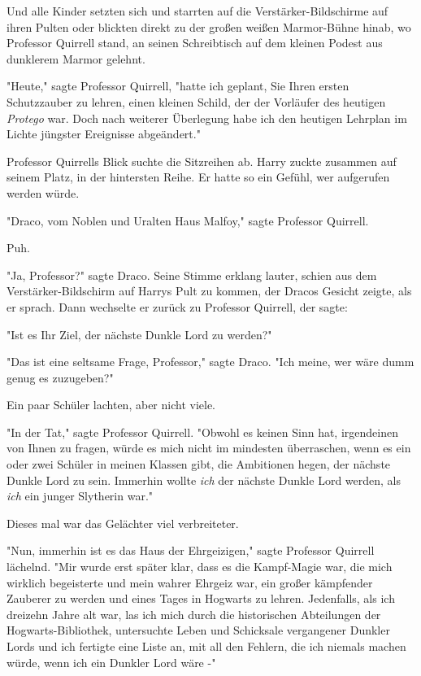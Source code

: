 {Und alle Kinder setzten sich und starrten auf die Verstärker-Bildschirme auf ihren Pulten oder blickten direkt zu der großen weißen Marmor-Bühne hinab, wo Professor Quirrell stand, an seinen Schreibtisch auf dem kleinen Podest aus dunklerem Marmor gelehnt.

"Heute," sagte Professor Quirrell, "hatte ich geplant, Sie Ihren ersten Schutzzauber zu lehren, einen kleinen Schild, der der Vorläufer des heutigen \emph{Protego} war. Doch nach weiterer Überlegung habe ich den heutigen Lehrplan im Lichte jüngster Ereignisse abgeändert."

Professor Quirrells Blick suchte die Sitzreihen ab. Harry zuckte zusammen auf seinem Platz, in der hintersten Reihe. Er hatte so ein Gefühl, wer aufgerufen werden würde.

"Draco, vom Noblen und Uralten Haus Malfoy," sagte Professor Quirrell.

Puh.

"Ja, Professor?" sagte Draco. Seine Stimme erklang lauter, schien aus dem Verstärker-Bildschirm auf Harrys Pult zu kommen, der Dracos Gesicht zeigte, als er sprach. Dann wechselte er zurück zu Professor Quirrell, der sagte:

"Ist es Ihr Ziel, der nächste Dunkle Lord zu werden?"

"Das ist eine seltsame Frage, Professor," sagte Draco. "Ich meine, wer wäre dumm genug es zuzugeben?"

Ein paar Schüler lachten, aber nicht viele.

"In der Tat," sagte Professor Quirrell. "Obwohl es keinen Sinn hat, irgendeinen von Ihnen zu fragen, würde es mich nicht im mindesten überraschen, wenn es ein oder zwei Schüler in meinen Klassen gibt, die Ambitionen hegen, der nächste Dunkle Lord zu sein. Immerhin wollte \emph{ich} der nächste Dunkle Lord werden, als \emph{ich} ein junger Slytherin war."

Dieses mal war das Gelächter viel verbreiteter.

"Nun, immerhin ist es das Haus der Ehrgeizigen," sagte Professor Quirrell lächelnd. "Mir wurde erst später klar, dass es die Kampf-Magie war, die mich wirklich begeisterte und mein wahrer Ehrgeiz war, ein großer kämpfender Zauberer zu werden und eines Tages in Hogwarts zu lehren. Jedenfalls, als ich dreizehn Jahre alt war, las ich mich durch die historischen Abteilungen der Hogwarts-Bibliothek, untersuchte Leben und Schicksale vergangener Dunkler Lords und ich fertigte eine Liste an, mit all den Fehlern, die ich niemals machen würde, wenn ich ein Dunkler Lord wäre -"

}
